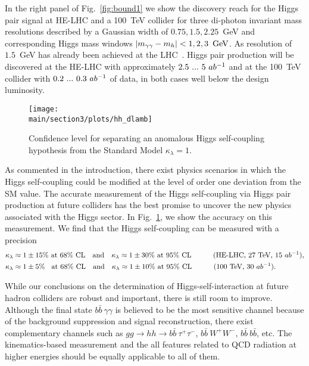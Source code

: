 In the right panel of Fig.~\ref{fig:bound1} we show the discovery reach for 
the Higgs pair signal at HE-LHC and a 100~TeV collider for three di-photon 
invariant mass resolutions described by a Gaussian width of 
$0.75,1.5,2.25$~GeV and corresponding Higgs mass windows 
$|m_{\gamma\gamma}-m_h|<1,2,3~\,\text{Ge\hspace{-.08em}V}$. As resolution of $1.5$~GeV 
has already been achieved at the LHC~\cite{CMS:2016zjv}. Higgs pair 
production will be discovered at the HE-LHC with approximately 
$2.5~...~5~ab^{-1}$ and at the 100~TeV collider with $0.2~...~0.3~ab^{-1}$ 
of data, in both cases well below the design luminosity.

\begin{figure}[t!]
\centering 
  \texttt{[image: \\main/section3/plots/hh\_dlamb]}
  \caption{Confidence level for separating an anomalous Higgs
    self-coupling hypothesis from the Standard Model
    $\kappa_{\lambda}=1$.}
 \label{fig:bound2}
\end{figure}

As commented in the introduction, there exist physics scenarios 
in which the Higgs self-coupling could be modified at the level of order 
one deviation from the SM value. The accurate measurement of the 
Higgs self-coupling via Higgs pair production at future colliders has the 
best promise to uncover the new physics associated with the Higgs sector.
In Fig.~\ref{fig:bound2}, we show the accuracy on this measurement. 
We find that the Higgs self-coupling can be measured with a precision
% 
\begin{align}
\kappa_{\lambda} &\approx 1 \pm 15\% \text{    at 68\% CL}\quad \text{and} \quad
\kappa_{\lambda} \approx 1 \pm 30\%   \text{    at 95\% CL}\quad\quad\quad
\text{(HE-LHC, 27~TeV, $15~ab^{-1}$)}  , \notag \\
\kappa_{\lambda} &\approx 1 \pm 5\% \;\; \text{    at 68\% CL}\quad \text{and}\quad
\kappa_{\lambda} \approx 1 \pm 10\% \text{    at 95\% CL} \quad\quad\quad
\text{(100~TeV, $30~ab^{-1}$).} 
\end{align}

While our conclusions on the determination of Higgs-self-interaction
at future hadron colliders are robust and important, there is still
room to improve. Although the final state $b\bar b\ \gamma\gamma$ is
believed to be the most sensitive channel because of the background
suppression and signal reconstruction, there exist complementary
channels such as ${gg\to hh \to b\bar b\ \tau^+\tau^-}$, $b\bar
b\ W^+W^-$, $b\bar b\ b\bar b$, etc. The kinematics-based measurement
and the all features related to QCD radiation at higher energies
should be equally applicable to all of them.

